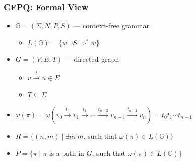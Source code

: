 \documentclass[xcolor=table]{beamer}
\begin{document}
\begin{frame} \frametitle{CFPQ: Formal View}
  \begin{itemize}
    \item $\mathbb{G} = (\Sigma, N, P, S)$ --- context-free grammar
    \begin{itemize}
      \item $L(\mathbb{G}) = \{ w \mid S \Rightarrow^* w \}$
    \end{itemize}
    \pause
    \item $G = (V,E,T)$ --- directed graph
      \begin{itemize}
        \item $v \xrightarrow{t} u \in E$
        \item $T \subseteq \Sigma$
      \end{itemize}
      \pause
    \item $\omega(\pi) = \omega(v_0 \xrightarrow{t_0} v_1 \xrightarrow{t_1} \cdots \xrightarrow{t_{n-2}} v_{n-1} \xrightarrow{t_{n-1}} v_n) = t_0 t_1 \cdots t_{n-1}$
    \pause
    \item $R = \{ (n, m) \mid \exists n \pi m$, such that $\omega(\pi) \in L(\mathbb{G})\}$
    \pause
    \item $P = \{ \pi \mid \pi$ is a path in $G$, such that $\omega(\pi) \in L(\mathbb{G})\}$
  \end{itemize}
\end{frame}
\end{document}
